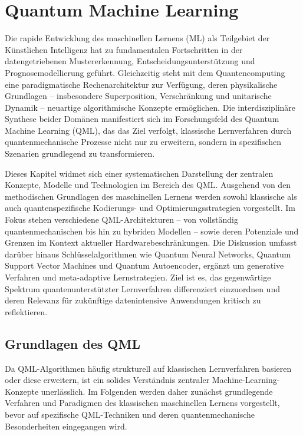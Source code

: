 
\chapter{Quantum Machine Learning}




Die rapide Entwicklung des maschinellen Lernens (ML) als Teilgebiet der Künstlichen Intelligenz hat zu fundamentalen Fortschritten in der datengetriebenen Mustererkennung, Entscheidungsunterstützung und Prognosemodellierung geführt. Gleichzeitig steht mit dem Quantencomputing eine paradigmatische Rechenarchitektur zur Verfügung, deren physikalische Grundlagen – insbesondere Superposition, Verschränkung und unitarische Dynamik – neuartige algorithmische Konzepte ermöglichen. Die interdisziplinäre Synthese beider Domänen manifestiert sich im Forschungsfeld des Quantum Machine Learning (QML), das das Ziel verfolgt, klassische Lernverfahren durch quantenmechanische Prozesse nicht nur zu erweitern, sondern in spezifischen Szenarien grundlegend zu transformieren.


Dieses Kapitel widmet sich einer systematischen Darstellung der zentralen Konzepte, Modelle und Technologien im Bereich des QML. Ausgehend von den methodischen Grundlagen des maschinellen Lernens werden sowohl klassische als auch quantenspezifische Kodierungs- und Optimierungsstrategien vorgestellt. Im Fokus stehen verschiedene QML-Architekturen – von vollständig quantenmechanischen bis hin zu hybriden Modellen – sowie deren Potenziale und Grenzen im Kontext aktueller Hardwarebeschränkungen. Die Diskussion umfasst darüber hinaus Schlüsselalgorithmen wie Quantum Neural Networks, Quantum Support Vector Machines und Quantum Autoencoder, ergänzt um generative Verfahren und meta-adaptive Lernstrategien. Ziel ist es, das gegenwärtige Spektrum quantenunterstützter Lernverfahren differenziert einzuordnen und deren Relevanz für zukünftige datenintensive Anwendungen kritisch zu reflektieren.


\section{Grundlagen des QML}
Da QML-Algorithmen häufig strukturell auf klassischen Lernverfahren basieren oder diese erweitern, ist ein solides Verständnis zentraler Machine-Learning-Konzepte unerlässlich. Im Folgenden werden daher zunächst grundlegende Verfahren und Paradigmen des klassischen maschinellen Lernens vorgestellt, bevor auf spezifische QML-Techniken und deren quantenmechanische Besonderheiten eingegangen wird.

